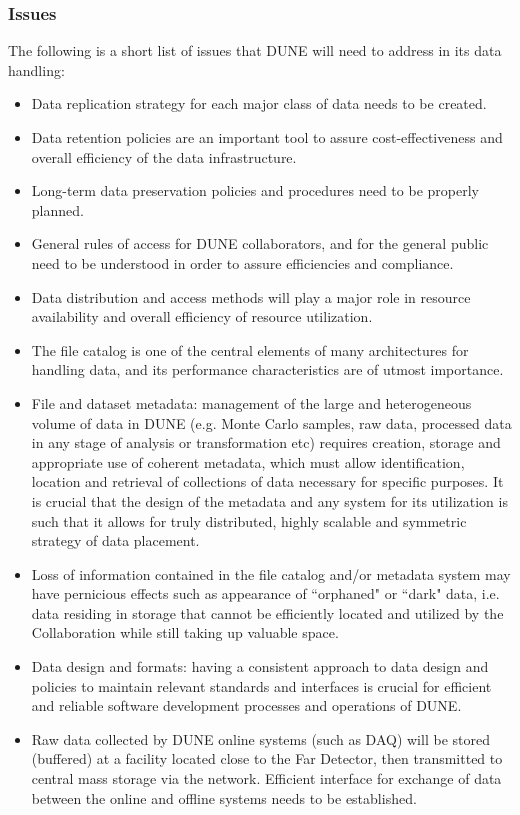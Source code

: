 \subsubsection{Issues}
The following is a short list of issues that DUNE will need to address in its data handling:
\begin{itemize}
\item Data replication strategy for each major class of data needs to be created.

\item Data retention policies are an important tool to assure cost-effectiveness and overall efficiency of the  data infrastructure.

\item Long-term data preservation policies and procedures need to be properly planned.

\item General rules of access for DUNE collaborators, and for the general public need to be understood in order to assure efficiencies and compliance.

\item Data distribution and access methods will play a major role in resource availability and overall efficiency of resource utilization.

\item The file catalog is one of the central elements of many architectures for handling data, and its performance characteristics are of utmost importance.

\item File and dataset metadata: management of the large and heterogeneous volume of data in DUNE  (e.g. Monte Carlo samples, raw data, processed data in any stage of analysis or transformation etc) requires creation, storage and appropriate use of coherent metadata, which must allow identification, location and retrieval of collections of data necessary for specific purposes. It is crucial that the design of the metadata and any system for its utilization is such that it allows for truly distributed, highly scalable and symmetric strategy of data placement.

\item Loss of information contained in the file catalog and/or metadata system may have pernicious effects such as appearance of ``orphaned" or ``dark" data, i.e. data 
residing in storage that cannot be efficiently located and utilized by the Collaboration while still taking up valuable space.

\item Data design and formats: having a consistent approach to data design and policies to maintain relevant standards and interfaces is crucial for efficient and reliable software development processes and operations of DUNE.

\item Raw data collected by DUNE  online systems (such as DAQ) will be stored (buffered) at a facility located close to the Far Detector, then transmitted to central mass storage via the network. Efficient interface for exchange of data between the online and offline systems needs to be established.

\end{itemize}
